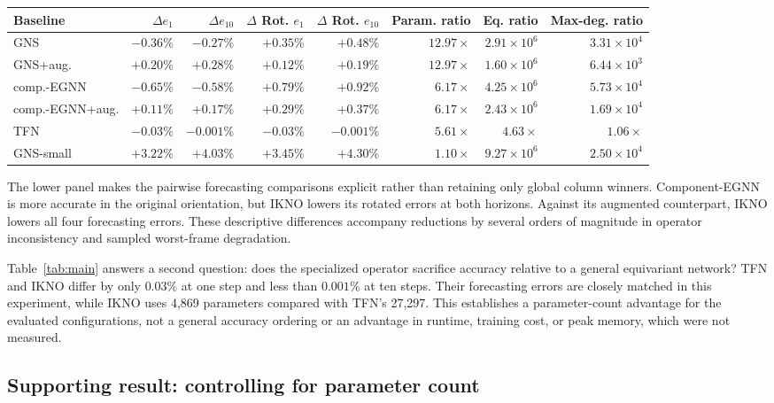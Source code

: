 \documentclass[mlmain]{jmlr}
\newcommand{\IKNO}{\textsc{IKNO}}
\begin{document}
\begin{table}[t]
{\vspace{5pt}
{\setlength{\tabcolsep}{3.1pt}\begin{tabular}{lrrrrrrr}
\toprule
Baseline & $\Delta e_1$ & $\Delta e_{10}$ & $\Delta$ Rot. $e_1$ & $\Delta$ Rot. $e_{10}$ & Param. ratio & Eq. ratio & Max-deg. ratio\\
\midrule
GNS & $-0.36\%$ & $-0.27\%$ & $+0.35\%$ & $+0.48\%$ & $12.97\!\times$ & $2.91\!\times\!10^6$ & $3.31\!\times\!10^4$\\
GNS+aug. & $+0.20\%$ & $+0.28\%$ & $+0.12\%$ & $+0.19\%$ & $12.97\!\times$ & $1.60\!\times\!10^6$ & $6.44\!\times\!10^3$\\
comp.-EGNN & $-0.65\%$ & $-0.58\%$ & $+0.79\%$ & $+0.92\%$ & $6.17\!\times$ & $4.25\!\times\!10^6$ & $5.73\!\times\!10^4$\\
comp.-EGNN+aug. & $+0.11\%$ & $+0.17\%$ & $+0.29\%$ & $+0.37\%$ & $6.17\!\times$ & $2.43\!\times\!10^6$ & $1.69\!\times\!10^4$\\
TFN & $-0.03\%$ & $-0.001\%$ & $-0.03\%$ & $-0.001\%$ & $5.61\!\times$ & $4.63\!\times$ & $1.06\!\times$\\
GNS-small & $+3.22\%$ & $+4.03\%$ & $+3.45\%$ & $+4.30\%$ & $1.10\!\times$ & $9.27\!\times\!10^6$ & $2.50\!\times\!10^4$\\
\bottomrule
\end{tabular}}
}
\end{table}

The lower panel makes the pairwise forecasting comparisons explicit rather
than retaining only global column winners. Component-EGNN is more accurate in
the original orientation, but \IKNO{} lowers its rotated errors at both
horizons. Against its augmented counterpart, \IKNO{} lowers all four
forecasting errors. These descriptive differences accompany reductions by
several orders of magnitude in operator inconsistency and sampled worst-frame
degradation.

Table~\ref{tab:main} answers a second question: does the specialized operator
sacrifice accuracy relative to a general equivariant network? TFN and \IKNO{}
differ by only $0.03\%$ at one step and less than $0.001\%$ at ten steps.
Their forecasting errors are closely matched in this experiment, while
\IKNO{} uses 4,869 parameters compared with TFN's 27,297. This establishes a
parameter-count advantage for the evaluated configurations, not a general
accuracy ordering or an advantage in runtime, training cost, or peak memory,
which were not measured.

\subsection{Supporting result: controlling for parameter count}
\end{document}
